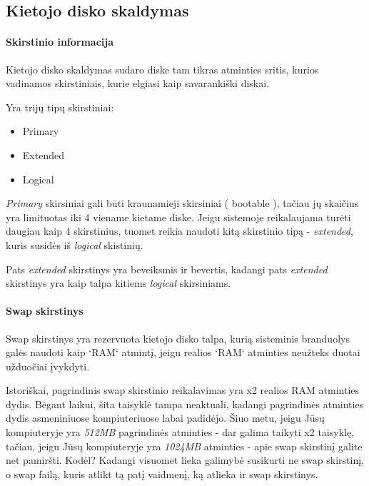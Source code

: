 \subsection{Kietojo disko skaldymas}

\paragraph{Skirstinio informacija}

Kietojo disko skaldymas sudaro diske tam tikras atminties sritis,
kurios vadinamos skirstiniais, kurie elgiasi kaip savarankiški diskai.

Yra trijų tipų skirstiniai:
\begin{itemize}
  \item Primary
  \item Extended
  \item Logical
\end{itemize}

\textsl{Primary} skirsiniai gali būti kraunamieji skirsiniai (
bootable ), tačiau jų skaičius yra limituotas iki 4 viename kietame
diske. Jeigu sistemoje reikalaujama turėti daugiau kaip 4 skirstinius,
tuomet reikia naudoti kitą skirstinio tipą - \textsl{extended}, kuris
susidės iš \textsl{logical} skistinių.

Pats \textsl{extended} skirstinys yra beveiksmis ir bevertis, kadangi
pats \textsl{extended} skirstinys yra kaip talpa kitiems
\textsl{logical} skirsiniams.

\paragraph{Swap skirstinys}

Swap skirstinys yra rezervuota kietojo disko talpa, kurią sisteminis
branduolys galės naudoti kaip `RAM` atmintį, jeigu realios `RAM`
atminties neužteks duotai užduočiai įvykdyti.

Istoriškai, pagrindinis swap skirstinio reikalavimas yra x2 realios
RAM atminties dydis. Bėgant laikui, šita taisyklė tampa neaktuali,
kadangi pagrindinės atminties dydis asmeniniuose kompiuteriuose labai
padidėjo. Šiuo metu, jeigu Jūsų kompiuteryje yra \textsl{512MB}
pagrindinės atminties - dar galima taikyti x2 taisyklę, tačiau, jeigu
Jūsų kompiuteryje yra \textsl{1024MB} atminties - apie swap skirstinį
galite net pamiršti. Kodėl? Kadangi visuomet lieka galimybė susikurti
ne swap skirstinį, o swap failą, kuris atlikt tą patį vaidmenį, ką
atlieka ir swap skirstinys.

